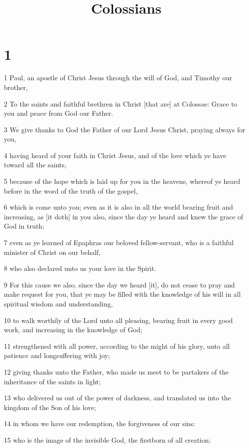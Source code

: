 

\title{Colossians}

\chapter{1}

\par 1 Paul, an apostle of Christ Jesus through the will of God, and Timothy our brother,
\par 2 To the saints and faithful brethren in Christ [that are] at Colossae: Grace to you and peace from God our Father.
\par 3 We give thanks to God the Father of our Lord Jesus Christ, praying always for you,
\par 4 having heard of your faith in Christ Jesus, and of the love which ye have toward all the saints,
\par 5 because of the hope which is laid up for you in the heavens, whereof ye heard before in the word of the truth of the gospel,
\par 6 which is come unto you; even as it is also in all the world bearing fruit and increasing, as [it doth] in you also, since the day ye heard and knew the grace of God in truth;
\par 7 even as ye learned of Epaphras our beloved fellow-servant, who is a faithful minister of Christ on our behalf,
\par 8 who also declared unto us your love in the Spirit.
\par 9 For this cause we also, since the day we heard [it], do not cease to pray and make request for you, that ye may be filled with the knowledge of his will in all spiritual wisdom and understanding,
\par 10 to walk worthily of the Lord unto all pleasing, bearing fruit in every good work, and increasing in the knowledge of God;
\par 11 strengthened with all power, according to the might of his glory, unto all patience and longsuffering with joy;
\par 12 giving thanks unto the Father, who made us meet to be partakers of the inheritance of the saints in light;
\par 13 who delivered us out of the power of darkness, and translated us into the kingdom of the Son of his love;
\par 14 in whom we have our redemption, the forgiveness of our sins:
\par 15 who is the image of the invisible God, the firstborn of all creation;

